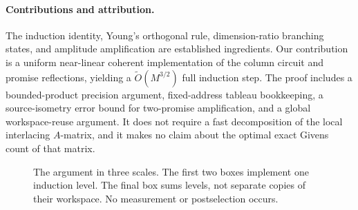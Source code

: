 \documentclass[11pt]{article}
\theoremstyle{definition}
\newcommand{\softO}{\widetilde O}
\begin{document}
\paragraph{Contributions and attribution.}
The induction identity, Young's orthogonal rule, dimension-ratio branching
states, and amplitude amplification are established ingredients.
Our contribution is a uniform near-linear coherent implementation of the
column circuit and promise reflections, yielding a
$\softO(M^{3/2})$ full induction step.
The proof includes a bounded-product precision argument, fixed-address
tableau bookkeeping, a source-isometry error bound for two-promise
amplification, and a global workspace-reuse argument.
It does not require a fast decomposition of the local interlacing
$A$-matrix, and it makes no claim about the optimal exact Givens count
of that matrix.

\begin{figure}[t]
\centering
{}
\caption{The argument in three scales. The first two boxes implement one
induction level. The final box sums levels, not separate copies of their
workspace. No measurement or postselection occurs.}\label{fig:overview}
\end{figure}
\end{document}
